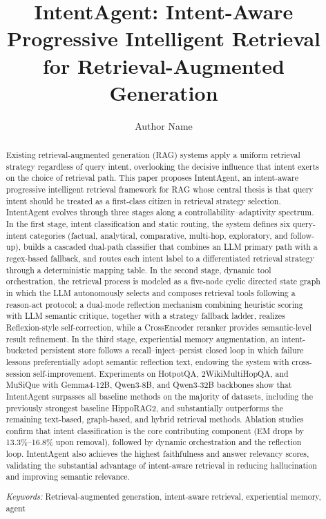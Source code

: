 \documentclass[runningheads]{llncs}
\begin{document}
\title{IntentAgent: Intent-Aware Progressive Intelligent Retrieval\\for Retrieval-Augmented Generation}

\author{Author Name}

\maketitle

\begin{abstract}
Existing retrieval-augmented generation (RAG) systems apply a uniform retrieval strategy regardless of query intent, overlooking the decisive influence that intent exerts on the choice of retrieval path. This paper proposes IntentAgent, an intent-aware progressive intelligent retrieval framework for RAG whose central thesis is that query intent should be treated as a first-class citizen in retrieval strategy selection. IntentAgent evolves through three stages along a controllability--adaptivity spectrum. In the first stage, intent classification and static routing, the system defines six query-intent categories (factual, analytical, comparative, multi-hop, exploratory, and follow-up), builds a cascaded dual-path classifier that combines an LLM primary path with a regex-based fallback, and routes each intent label to a differentiated retrieval strategy through a deterministic mapping table. In the second stage, dynamic tool orchestration, the retrieval process is modeled as a five-node cyclic directed state graph in which the LLM autonomously selects and composes retrieval tools following a reason-act protocol; a dual-mode reflection mechanism combining heuristic scoring with LLM semantic critique, together with a strategy fallback ladder, realizes Reflexion-style self-correction, while a CrossEncoder reranker provides semantic-level result refinement. In the third stage, experiential memory augmentation, an intent-bucketed persistent store follows a recall--inject--persist closed loop in which failure lessons preferentially adopt semantic reflection text, endowing the system with cross-session self-improvement. Experiments on HotpotQA, 2WikiMultiHopQA, and MuSiQue with Gemma4-12B, Qwen3-8B, and Qwen3-32B backbones show that IntentAgent surpasses all baseline methods on the majority of datasets, including the previously strongest baseline HippoRAG2, and substantially outperforms the remaining text-based, graph-based, and hybrid retrieval methods. Ablation studies confirm that intent classification is the core contributing component (EM drops by 13.3\%--16.8\% upon removal), followed by dynamic orchestration and the reflection loop. IntentAgent also achieves the highest faithfulness and answer relevancy scores, validating the substantial advantage of intent-aware retrieval in reducing hallucination and improving semantic relevance.

\noindent\textit{Keywords:} Retrieval-augmented generation, intent-aware retrieval, experiential memory, agent
\end{abstract}
\end{document}
